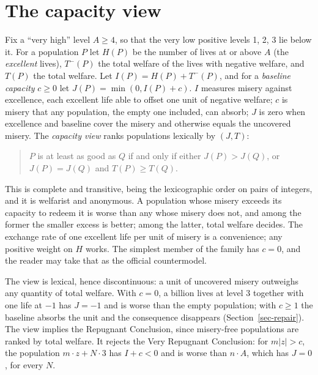 \documentclass[
  11pt,
  letterpaper,
  DIV=11,
  numbers=noendperiod,
  twoside]{scrartcl}
\begin{document}
\section{The capacity view}\label{sec-capacity}

Fix a ``very high'' level \(A \geq 4\), so that the very low positive
levels 1, 2, 3 lie below it. For a population \(P\) let \(H(P)\) be the
number of lives at or above \(A\) (the \emph{excellent} lives),
\(T^-(P)\) the total welfare of the lives with negative welfare, and
\(T(P)\) the total welfare. Let \(I(P) = H(P) + T^-(P)\), and for a
\emph{baseline capacity} \(c \geq 0\) let \(J(P) = \min(0, I(P) + c)\).
\(I\) measures misery against excellence, each excellent life able to
offset one unit of negative welfare; \(c\) is misery that any
population, the empty one included, can absorb; \(J\) is zero when
excellence and baseline cover the misery and otherwise equals the
uncovered misery. The \emph{capacity view} ranks populations lexically
by \((J, T)\):

\begin{quote}
\(P\) is at least as good as \(Q\) if and only if either
\(J(P) > J(Q)\), or \(J(P) = J(Q)\) and \(T(P) \geq T(Q)\).
\end{quote}

This is complete and transitive, being the lexicographic order on pairs
of integers, and it is welfarist and anonymous. A population whose
misery exceeds its capacity to redeem it is worse than any whose misery
does not, and among the former the smaller excess is better; among the
latter, total welfare decides. The exchange rate of one excellent life
per unit of misery is a convenience; any positive weight on \(H\) works.
The simplest member of the family has \(c = 0\), and the reader may take
that as the official countermodel.

The view is lexical, hence discontinuous: a unit of uncovered misery
outweighs any quantity of total welfare. With \(c = 0\), a billion lives
at level 3 together with one life at \(-1\) has \(J = -1\) and is worse
than the empty population; with \(c \geq 1\) the baseline absorbs the
unit and the consequence disappears (Section~\ref{sec-repair}). The view
implies the Repugnant Conclusion, since misery-free populations are
ranked by total welfare. It rejects the Very Repugnant Conclusion: for
\(m|z| > c\), the population \(m \cdot z + N \cdot 3\) has \(I + c < 0\)
and is worse than \(n \cdot A\), which has \(J = 0\), for every \(N\).
\end{document}
